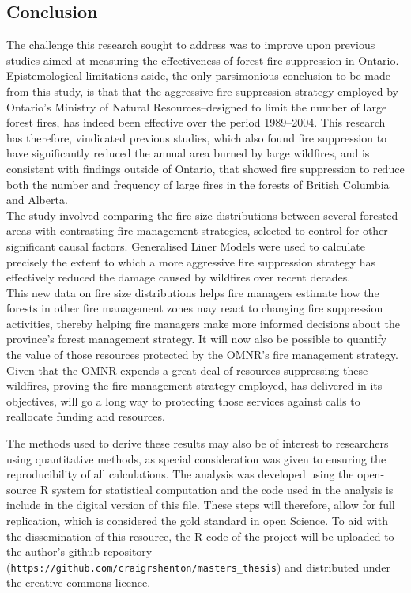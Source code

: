 \begin{spacing}{1.5}
\phantom
\phantom
\phantom
\phantom
\section{Conclusion}
\phantom
\phantom
The challenge this research sought to address was to improve upon previous studies aimed at measuring the effectiveness of forest fire suppression in Ontario. Epistemological limitations aside, the only parsimonious conclusion to be made from this study, is that that the aggressive fire suppression strategy employed by Ontario's Ministry of Natural Resources--designed to limit the number of large forest fires, has indeed been effective over the period 1989--2004. This research has therefore, vindicated previous studies, which also found fire suppression to have significantly reduced the annual area burned by large wildfires, and is consistent with findings outside of Ontario, that showed fire suppression to reduce both the number and frequency of large fires in the forests of British Columbia and Alberta.\\

\noindent The study involved comparing the fire size distributions between several forested areas with contrasting fire management strategies, selected to control for other significant causal factors. Generalised Liner Models were used to calculate precisely the extent to which a more aggressive fire suppression strategy has effectively reduced the damage caused by wildfires over recent decades. \\

\noindent This new data on fire size distributions helps fire managers estimate how the forests in other fire management zones may react to changing fire suppression activities, thereby helping fire managers make more informed decisions about the province's forest management strategy. It will now also be possible to quantify the value of those resources protected by the OMNR's fire management strategy. Given that the OMNR expends a great deal of resources suppressing these wildfires, proving the fire management strategy employed, has delivered in its objectives, will go a long way to protecting those services against calls to reallocate funding and resources.\\

\clearpage

\noindent The methods used to derive these results may also be of interest to researchers using quantitative methods, as special consideration was given to ensuring the reproducibility of all calculations. The analysis was developed using the open-source R system for statistical computation and the code used in the analysis is include in the digital version of this file. These steps will therefore, allow for full replication, which is considered the gold standard in open Science. To aid with the dissemination of this resource, the R code of the project will be uploaded to the author's github repository (\texttt{https://github.com/craigrshenton/masters\_\linebreak thesis}) and distributed under the creative commons licence.\\


\end{spacing}
\clearpage
